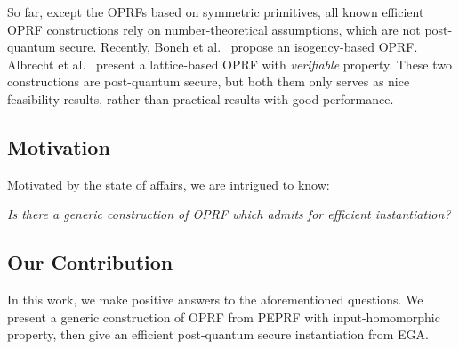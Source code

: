 \documentclass[a4paper,10pt]{article}
\begin{document}
So far, except the OPRFs based on symmetric primitives, all known efficient OPRF constructions 
rely on number-theoretical assumptions, which are not post-quantum secure. 
Recently, Boneh et al.~\cite{BKW-ASIACRYPT-2020} propose an isogency-based OPRF. 
Albrecht et al.~\cite{ADDS-PKC-2021} present a lattice-based OPRF with \emph{verifiable} property. 
These two constructions are post-quantum secure, but both them only serves as nice feasibility results, 
rather than practical results with good performance.  


\subsection{Motivation}
Motivated by the state of affairs, we are intrigued to know:
\begin{center}
\emph{Is there a generic construction of OPRF which admits for efficient instantiation?} 
\end{center}  

\subsection{Our Contribution}
In this work, we make positive answers to the aforementioned questions. 
We present a generic construction of OPRF from PEPRF with input-homomorphic property, 
then give an efficient post-quantum secure instantiation from EGA.     








\end{document}
